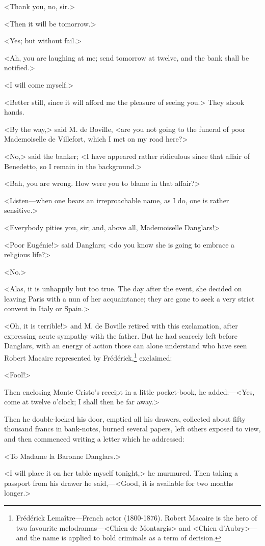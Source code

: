  <Thank you, no, sir.> 

 <Then it will be tomorrow.> 

 <Yes; but without fail.> 

 <Ah, you are laughing at me; send tomorrow at twelve, and the bank shall be notified.> 

 <I will come myself.> 

 <Better still, since it will afford me the pleasure of seeing you.> They shook hands. 

 <By the way,> said M. de Boville, <are you not going to the funeral of poor Mademoiselle de Villefort, which I met on my road here?> 

 <No,> said the banker; <I have appeared rather ridiculous since that affair of Benedetto, so I remain in the background.> 

 <Bah, you are wrong. How were you to blame in that affair?> 

 <Listen—when one bears an irreproachable name, as I do, one is rather sensitive.> 

 <Everybody pities you, sir; and, above all, Mademoiselle Danglars!> 

 <Poor Eugénie!> said Danglars; <do you know she is going to embrace a religious life?> 

 <No.> 

 <Alas, it is unhappily but too true. The day after the event, she decided on leaving Paris with a nun of her acquaintance; they are gone to seek a very strict convent in Italy or Spain.> 

 <Oh, it is terrible!> and M. de Boville retired with this exclamation, after expressing acute sympathy with the father. But he had scarcely left before Danglars, with an energy of action those can alone understand who have seen Robert Macaire represented by Frédérick,\footnote{Frédérick Lemaître—French actor (1800-1876). Robert Macaire is the hero of two favourite melodramas—<Chien de Montargis> and <Chien d'Aubry>—and the name is applied to bold criminals as a term of derision.} exclaimed: 

 <Fool!> 

 Then enclosing Monte Cristo's receipt in a little pocket-book, he added:—<Yes, come at twelve o'clock; I shall then be far away.> 

 Then he double-locked his door, emptied all his drawers, collected about fifty thousand francs in bank-notes, burned several papers, left others exposed to view, and then commenced writing a letter which he addressed: 

 <To Madame la Baronne Danglars.> 

 <I will place it on her table myself tonight,> he murmured. Then taking a passport from his drawer he said,—<Good, it is available for two months longer.> 